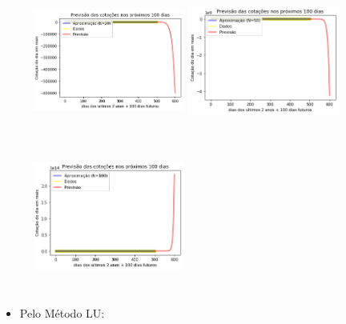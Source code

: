 \documentclass{article}
\begin{document}
\begin{figure}[!htb]
\includegraphics [width=5cm,height=5cm]{PrevisaoG/P20.png}
\includegraphics [width=5cm,height=5cm]{PrevisaoG/P50.png}
\includegraphics [width=5cm,height=5cm]{PrevisaoG/P100.png}
\end{figure}

\begin{itemize}
\item Pelo Método LU:
\end{itemize}
\end{document}
